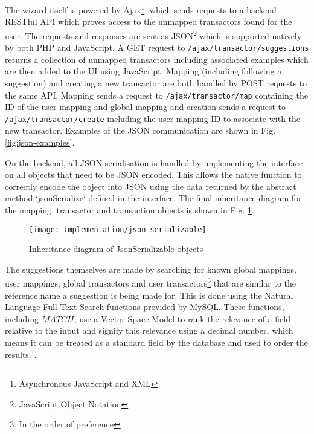 The wizard itself is powered by Ajax\footnote{Asynchronous JavaScript and XML}, which sends requests to a backend RESTful API which proves access to the unmapped transactors found for the user. The requests and responses are sent as JSON\footnote{JavaScript Object Notation} which is supported natively by both PHP and JavaScript. A GET request to \lstinline{/ajax/transactor/suggestions} returns a collection of unmapped transactors including associated examples which are then added to the UI using JavaScript.
%
Mapping (including following a suggestion) and creating a new transactor are both handled by POST requests to the same API. Mapping sends a request to \lstinline{/ajax/transactor/map} containing the ID of the user mapping and global mapping  and creation sends a request to \lstinline{/ajax/transactor/create} including the user mapping ID to associate with the new transactor. 
%
Examples of the JSON communication are shown in Fig. \ref{fig:json-examples}.

On the backend, all JSON serialisation is handled by implementing the  interface on all objects that need to be JSON encoded. This allows the native function  to correctly encode the object into JSON using the data returned by the abstract method `jsonSerialize` defined in the interface. The final inheritance diagram for the mapping, transactor and transaction objects is shown in Fig. \ref{fig:mapping-inheritance-diagram}.

\begin{figure}[h]
    \centering
    \texttt{[image: implementation/json-serializable]}
    \caption{Inheritance diagram of JsonSerializable objects}
    \label{fig:mapping-inheritance-diagram}
    
    \begin{comment}
[<<Interface>> JsonSerializable]^-[<<Abstract>> Transactor]
[<<Interface>> JsonSerializable]^-[<<Abstract>> TransactorMapping]
[<<Interface>> JsonSerializable]^-[Transaction]
[<<Abstract>> TransactorMapping]^-[UserTransactorMapping]
[<<Abstract>> TransactorMapping]^-[GlobalTransactorMapping]
[<<Abstract>> Transactor]^-[UserTransactor]
[<<Abstract>> Transactor]^-[GlobalTransactor]
    \end{comment}
\end{figure}

The suggestions themselves are made by searching for known global mappings, user mappings, global transactors and user transactors\footnote{In the order of preference} that are similar to the reference name a suggestion is being made for. This is done using the Natural Language Full-Text Search functions provided by MySQL. These functions, including \inlinesql$MATCH$, use a Vector Space Model to rank the relevance of a field relative to the input and signify this relevance using a decimal number, which means it can be treated as a standard field by the database and used to order the results.  \parencite{mysql2014searches}. 

